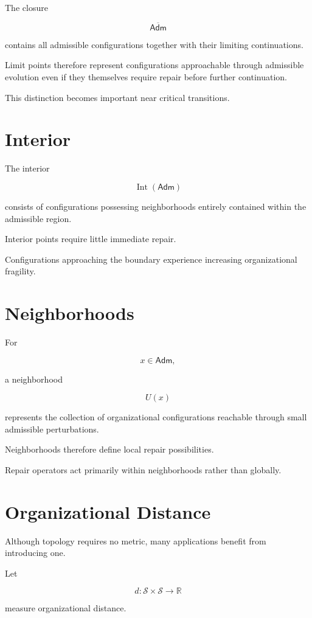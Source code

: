 \documentclass[11pt,oneside]{book}
\numberwithin{equation}{chapter}
\theoremstyle{definition}
\theoremstyle{plain}
\newcommand{\Adm}{\mathsf{Adm}}
\begin{document}
The closure

\[
\overline{\Adm}
\]

contains all admissible configurations together with their limiting
continuations.

Limit points therefore represent configurations approachable through
admissible evolution even if they themselves require repair before
further continuation.

This distinction becomes important near critical transitions.

\section{Interior}

The interior

\[
\operatorname{Int}
(\Adm)
\]

consists of configurations possessing neighborhoods entirely contained
within the admissible region.

Interior points require little immediate repair.

Configurations approaching the boundary experience increasing
organizational fragility.

\section{Neighborhoods}

For

\[
x
\in
\Adm,
\]

a neighborhood

\[
U(x)
\]

represents the collection of organizational configurations reachable
through small admissible perturbations.

Neighborhoods therefore define local repair possibilities.

Repair operators act primarily within neighborhoods rather than globally.

\section{Organizational Distance}

Although topology requires no metric, many applications benefit from
introducing one.

Let

\[
d
:
\mathcal S
\times
\mathcal S
\rightarrow
\mathbb R
\]

measure organizational distance.
\end{document}
